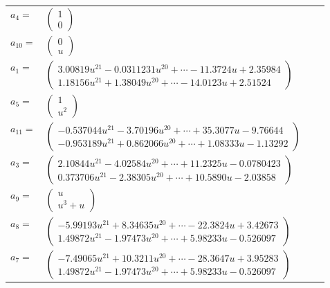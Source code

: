 \documentclass[1p]{elsarticle_modified}
\theoremstyle{definition}
\begin{document}
\begin{tabular}{m{7pt} m{180pt} m{7pt} m{180pt} }
\flushright $a_{4}=$&$\begin{pmatrix}1\\0\end{pmatrix}$ \\
\flushright $a_{10}=$&$\begin{pmatrix}0\\u\end{pmatrix}$ \\
\flushright $a_{1}=$&$\begin{pmatrix}3.00819 u^{21}-0.0311231 u^{20}+\cdots-11.3724 u+2.35984\\1.18156 u^{21}+1.38049 u^{20}+\cdots-14.0123 u+2.51524\end{pmatrix}$ \\
\flushright $a_{5}=$&$\begin{pmatrix}1\\u^2\end{pmatrix}$ \\
\flushright $a_{11}=$&$\begin{pmatrix}-0.537044 u^{21}-3.70196 u^{20}+\cdots+35.3077 u-9.76644\\-0.953189 u^{21}+0.862066 u^{20}+\cdots+1.08333 u-1.13292\end{pmatrix}$ \\
\flushright $a_{3}=$&$\begin{pmatrix}2.10844 u^{21}-4.02584 u^{20}+\cdots+11.2325 u-0.0780423\\0.373706 u^{21}-2.38305 u^{20}+\cdots+10.5890 u-2.03858\end{pmatrix}$ \\
\flushright $a_{9}=$&$\begin{pmatrix}u\\u^3+u\end{pmatrix}$ \\
\flushright $a_{8}=$&$\begin{pmatrix}-5.99193 u^{21}+8.34635 u^{20}+\cdots-22.3824 u+3.42673\\1.49872 u^{21}-1.97473 u^{20}+\cdots+5.98233 u-0.526097\end{pmatrix}$ \\
\flushright $a_{7}=$&$\begin{pmatrix}-7.49065 u^{21}+10.3211 u^{20}+\cdots-28.3647 u+3.95283\\1.49872 u^{21}-1.97473 u^{20}+\cdots+5.98233 u-0.526097\end{pmatrix}$ \\

\end{tabular}
\end{document}
